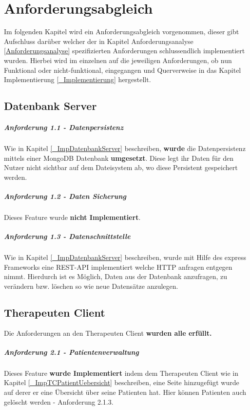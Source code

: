 \chapter{Anforderungsabgleich} \label{Anforderungsabgleich} 
Im folgenden Kapitel wird ein Anforderungsabgleich vorgenommen, dieser gibt Aufschluss darüber welcher der in Kapitel Anforderungsanalyse \ref{Anforderungsanalyse} spezifizierten Anforderungen schlussendlich implementiert wurden.
Hierbei wird im einzelnen auf die jeweiligen Anforderungen, ob nun Funktional oder nicht-funktional, eingegangen und Querverweise in das Kapitel Implementierung \ref{_Implementierung} hergestellt.

\section{Datenbank Server}
\paragraph{Anforderung 1.1 - Datenpersistenz}
Wie in Kapitel \ref{_ImpDatenbankServer} beschreiben, \textbf{wurde} die Datenpersistenz mittels einer MongoDB Datenbank \textbf{umgesetzt}. Diese legt ihr Daten für den Nutzer nicht sichtbar auf dem Dateisystem ab, wo diese Persistent gespeichert werden.

\paragraph{Anforderung 1.2 - Daten Sicherung}
Dieses Feature wurde \textbf{nicht Implementiert}.

\paragraph{Anforderung 1.3 - Datenschnittstelle}
Wie in Kapitel \ref{_ImpDatenbankServer} beschreiben, wurde mit Hilfe des express Frameworks eine REST-API implementiert welche HTTP anfragen entgegen nimmt. Hierdurch ist es Möglich, Daten aus der Datenbank anzufragen, zu verändern bzw. löschen so wie neue Datensätze anzulegen.


\section{Therapeuten Client}
Die Anforderungen an den Therapeuten Client \textbf{wurden alle erfüllt.}
\paragraph{Anforderung 2.1 - Patientenverwaltung}
Dieses Feature \textbf{wurde Implementiert} indem dem Therapeuten Client wie in Kapitel \ref{_ImpTCPatientUebersicht} beschreiben, eine Seite hinzugefügt wurde auf derer er eine Übersicht über seine Patienten hat. Hier können Patienten auch gelöscht werden - Anforderung 2.1.3.

